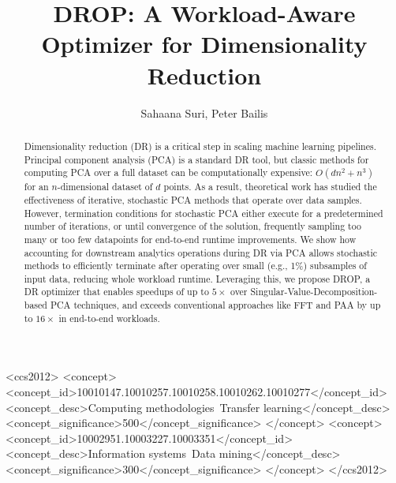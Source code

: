 \documentclass[sigconf,10pt]{acmart}
\newcommand{\red}[1]{{\color{black}#1}}
\theoremstyle{problem}
\begin{document}
\title{DROP: A Workload-Aware Optimizer for Dimensionality Reduction}


\author{Sahaana Suri, Peter Bailis}

\renewcommand{\shortauthors}{S. Suri and P. Bailis}



\begin{abstract}
Dimensionality reduction (DR) is a critical step in scaling machine learning pipelines. Principal component analysis (PCA) is a standard DR tool, but classic methods for computing PCA over a full dataset can be computationally expensive: $O(dn^2 + n^3)$ for an $n$-dimensional dataset of $d$ points. 
As a result, theoretical work has studied the effectiveness of iterative, stochastic PCA methods that operate over data samples. 
However, termination conditions for stochastic PCA either execute for a predetermined number of iterations, or until convergence of the solution, frequently sampling too many or too few datapoints for end-to-end runtime improvements. We show how accounting for downstream analytics operations during DR via PCA allows stochastic methods to efficiently terminate after operating over small (e.g., 1\%) subsamples of input data, reducing whole workload runtime. 
Leveraging this, we propose DROP, a DR optimizer that enables speedups of up to \red{$5\times$} over \red{Singular-Value-Decomposition-based} PCA techniques, and exceeds conventional approaches like FFT and PAA by up to \red{$16\times$} in end-to-end workloads.
\end{abstract}


\begin{CCSXML}
<ccs2012>
<concept>
<concept_id>10010147.10010257.10010258.10010262.10010277</concept_id>
<concept_desc>Computing methodologies~Transfer learning</concept_desc>
<concept_significance>500</concept_significance>
</concept>
<concept>
<concept_id>10002951.10003227.10003351</concept_id>
<concept_desc>Information systems~Data mining</concept_desc>
<concept_significance>300</concept_significance>
</concept>
</ccs2012>
\end{CCSXML}

\maketitle

%



%



%



%
\end{document}
